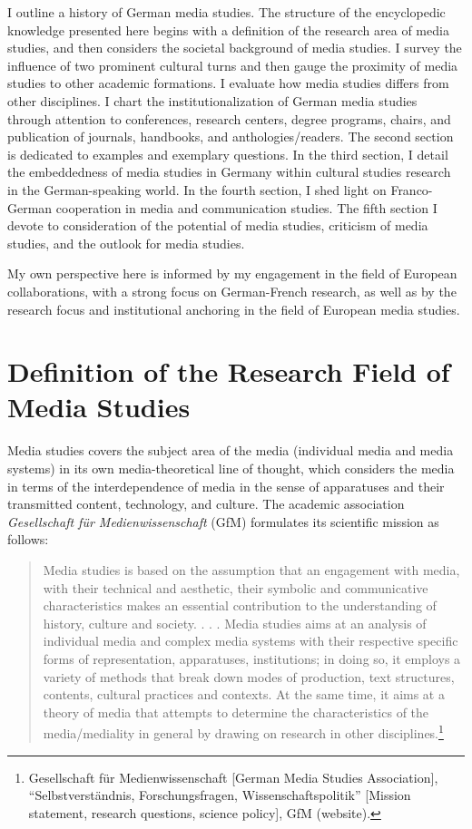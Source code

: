 \documentclass{tufte-handout}
\begin{document}
 I outline a history of German media studies. The
structure of the encyclopedic knowledge presented here begins with a
definition of the research area of media studies, and then considers the
societal background of media studies. I survey the influence of two
prominent cultural turns and then gauge the proximity of media studies
to other academic formations. I evaluate how media studies differs from
other disciplines. I chart the institutionalization of German media
studies through attention to conferences, research centers, degree
programs, chairs, and publication of journals, handbooks, and
anthologies/readers. The second section is dedicated to examples and
exemplary questions. In the third section, I detail the embeddedness of
media studies in Germany within cultural studies research in the
German-speaking world. In the fourth section, I shed light on
Franco-German cooperation in media and communication studies. The fifth
section I devote to consideration of the potential of media studies,
criticism of media studies, and the outlook for media studies.

My own perspective here is informed by my engagement in the field of
European collaborations, with a strong focus on German-French research,
as well as by the research focus and institutional anchoring in the
field of European media studies.

\hypertarget{definition-of-the-research-field-of-media-studies}{%
\section{Definition of the Research Field of Media
Studies}\label{definition-of-the-research-field-of-media-studies}}

Media studies covers the subject area of the media (individual media and
media systems) in its own media-theoretical line of thought, which
considers the media in terms of the interdependence of media in the
sense of apparatuses and their transmitted content, technology, and
culture. The academic association \emph{Gesellschaft für
Medienwissenschaft} (GfM) formulates its scientific mission as follows:

\begin{quote}
Media studies is based on the assumption that an engagement with media,
with their technical and aesthetic, their symbolic and communicative
characteristics makes an essential contribution to the understanding of
history, culture and society. . . . Media studies aims at an analysis of
individual media and complex media systems with their respective
specific forms of representation, apparatuses, institutions; in doing
so, it employs a variety of methods that break down modes of production,
text structures, contents, cultural practices and contexts. At the same
time, it aims at a theory of media that attempts to determine the
characteristics of the media/mediality in general by drawing on research
in other disciplines.\footnote{Gesellschaft für Medienwissenschaft
  {[}German Media Studies Association{]}, ``Selbstverständnis,
  Forschungsfragen, Wissenschaftspolitik'' {[}Mission statement,
  research questions, science policy{]}, GfM (website).}
\end{quote}
\end{document}
